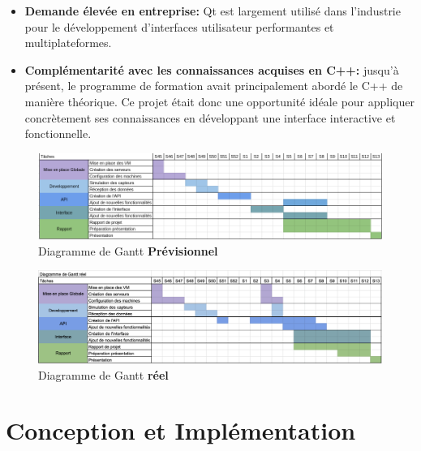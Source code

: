 \documentclass[10pt, a4paper]{report}
\begin{document}
	\begin{itemize}
		\item \textbf{Demande élevée en entreprise: } Qt est largement utilisé dans l’industrie pour le développement d’interfaces utilisateur performantes et multiplateformes.
		\item \textbf{Complémentarité avec les connaissances acquises en C++:} jusqu’à présent, le programme de formation avait principalement abordé le C++ de manière théorique. Ce projet était donc une opportunité idéale pour appliquer concrètement ses connaissances en développant une interface interactive et fonctionnelle.
	\end{itemize}
	\vspace{3cm}
	\begin{figure}[h!]
		\centering
		\includegraphics[width=1\textwidth]{ressources/img/Gantt/diagrammePrevisionnel}
		\caption{Diagramme de Gantt \textbf{Prévisionnel}}
		\label{fig:GanttPrevisionnel}
	\end{figure}
		\begin{figure}[h!]
		\centering
		\includegraphics[width=1\textwidth]{ressources/img/Gantt/diagrammeReel}
		\caption{Diagramme de Gantt \textbf{réel}}
		\label{fig:GanttReel}
	\end{figure}
	
	
	\chapter{Conception et Implémentation}
	
\end{document}
